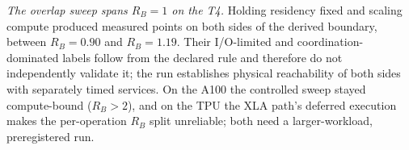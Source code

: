 \emph{The overlap sweep spans $R_B=1$ on the T4.} Holding residency fixed and
scaling compute produced measured points on both sides of the derived boundary,
between $R_B=0.90$ and $R_B=1.19$. Their I/O-limited and
coordination-dominated labels follow from the declared rule and therefore do
not independently validate it; the run establishes physical reachability of both
sides with separately timed services. On the A100 the controlled sweep stayed
compute-bound ($R_B>2$), and on the TPU the XLA path's deferred execution makes
the per-operation $R_B$ split unreliable; both need a larger-workload,
preregistered run.

\begin{table}[t]
\centering
\caption{\textbf{Residency comparison across accelerators.} Descriptive
comparison across \NumAccel{} accelerators (layered probe,
$d=2048$). $T$ is mean per-step latency; ``Ratio'' is capacity-limited over
resident. The direction (ratio $>1$) is the predicted effect; magnitudes are
device-dependent and not predicted.}
\label{tab:accel}
\setlength{\tabcolsep}{4pt}

\end{table}
